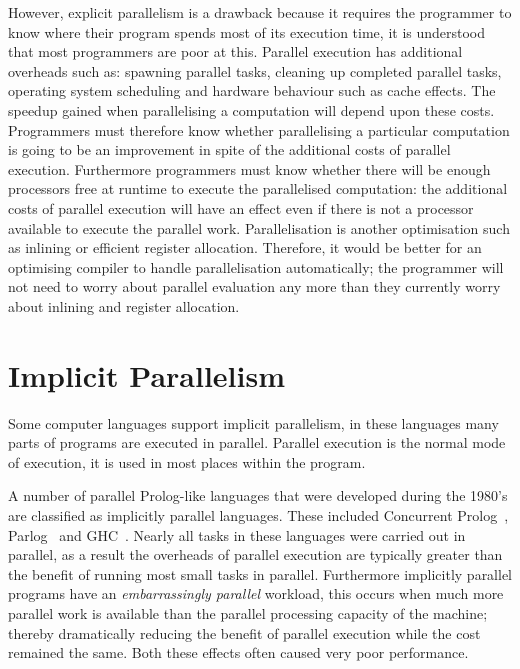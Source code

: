 However, explicit parallelism is a drawback because it requires the
programmer to know where their program spends most of its execution
time, it is understood that most programmers are poor at this.
Parallel execution has additional overheads such as:
spawning parallel tasks,
cleaning up completed parallel tasks,
operating system scheduling and
hardware behaviour such as cache effects.
The speedup gained when parallelising a computation will depend upon
these costs.
Programmers must therefore know whether parallelising a particular
computation is going to be an improvement in spite of the additional
costs of parallel execution.
Furthermore programmers must know whether there will be enough
processors free at runtime to execute the parallelised computation:
the additional costs of parallel execution will have an effect even
if there is not a processor available to execute the parallel work.
Parallelisation is another optimisation such as inlining or efficient
register allocation.
Therefore,
it would be better for an optimising compiler to handle parallelisation
automatically;
the programmer will not need to worry about parallel evaluation any more
than they currently worry about inlining and register allocation.

\section{Implicit Parallelism}
\label{sec:intro_implicit_par}

Some computer languages support implicit parallelism,
in these languages many parts of programs are executed in parallel.
Parallel execution is the normal mode of execution,
it is used in most places within the program.

A number of parallel Prolog-like languages that were developed during the
1980's are classified as implicitly parallel languages.
These included Concurrent
Prolog~\citep{saraswat85:probl_with_concur_prolog,saraswat86:concurrent_prolog_definition,shapiro:flat_concur_prolog},
Parlog~\citep{clark:84:parlog_sys_prog,clark:86:parlog} and GHC~\citep{ueda:ghc}.
Nearly all tasks in these languages were carried out in
parallel,
as a result the overheads of parallel execution are typically
greater than the benefit of running most small tasks in parallel.
Furthermore implicitly parallel programs have an \emph{embarrassingly
  parallel} workload,
this occurs when much more parallel work is available than the parallel
processing capacity of the machine;
thereby dramatically reducing the benefit of parallel execution while
the cost remained the same.
Both these effects often caused very poor performance.


